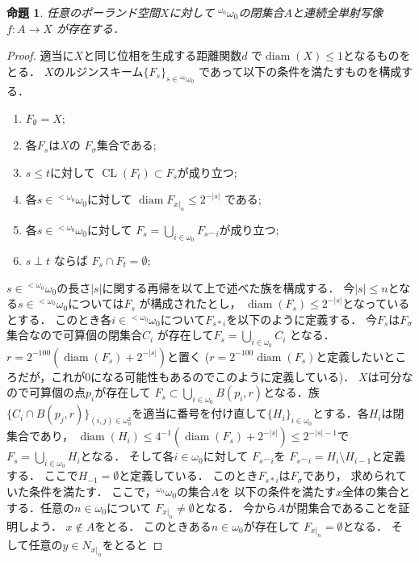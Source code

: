 \documentclass[leqno, 12pt]{jsarticle}
\newtheorem{prop}[thm]{命題}
\DeclareMathOperator{\cl}{CL}
\DeclareMathOperator{\di}{diam}
\newcommand{\myomega}{\omega_{0}}
\newcommand{\mybairetb}{{}^{<\myomega}\myomega}
\newcommand{\mybaire}{{}^{\myomega}\myomega}
\newcommand{\myff}{\frown}
\newcommand{\mynbd}[1]{N_{#1}}
\begin{document}
\begin{prop}\label{prop:inj}
任意のポーランド空間$X$に対して
$\mybaire$の閉集合$A$と連続全単射写像
$f\colon A\to X$
が存在する．
\end{prop}
\begin{proof}
適当に$X$と同じ位相を生成する距離関数$d$
で$\di (X)\le 1$となるものをとる．
$X$のルジンスキーム$\{F_{s}\}_{s\in \mybaire}$
であって以下の条件を満たすものを構成する．
\begin{enumerate}[label=\textup{(\arabic*)}]
\item\label{item:l:0}
$F_{\emptyset}=X$;
\item\label{item:l:1}
各$F_{s}$は$X$の
$F_{\sigma}$集合である;
\item\label{item:l:2}
$s\le t$に対して
$\cl(F_{t})\subset F_{s}$が成り立つ;
\item\label{item:l:3}
各$s\in \mybairetb$に対して
$\di F_{x|_{n}}\le 2^{-|s|}$
である;
\item\label{item:l:4}
各$s\in \mybairetb$に対して
$F_{s}=\bigcup_{i\in \myomega}F_{s\myff i}$が成り立つ;
\item\label{item:l:5}
$s\perp t$ ならば
$F_{s}\cap F_{t}=\emptyset$;
\end{enumerate}
$s\in \mybairetb$の長さ$|s|$に関する再帰を以て上で述べた族を構成する．
今$|s|\le n$となる$s\in \mybairetb$については$F_{s}$
が構成されたとし，
$\di(F_{s})\le 2^{-|s|}$となっているとする．
このとき各$i\in \mybairetb$について$F_{s*i}$を以下のように定義する．
今$F_{s}$は$F_{\sigma}$集合なので可算個の閉集合$C_{i}$
が存在して$F_{s}=\bigcup_{i\in \myomega}C_{i}$
となる．$r=2^{-100}(\di (F_{s})+2^{-|s|})$と置く
($r=2^{-100}\di (F_{s})$と定義したいところだが，これが$0$になる可能性もあるのでこのように定義している)．
$X$は可分なので可算個の点$p_{i}$が存在して
$F_{s}\subset \bigcup_{i\in \myomega}B(p_{i}, r)$となる．族$\{C_{i}\cap B(p_{j}, r)\}_{(i, j)\in \myomega^{2}}$を適当に番号を付け直して$\{H_{i}\}_{i\in \myomega}$とする．各$H_{i}$は閉集合であり，
$\di(H_{i})\le 4^{-1}(\di (F_{s})+2^{-|s|})\le 2^{-|s|-1}$で
$F_{s}=\bigcup_{i\in \myomega}H_{i}$となる．
そして各$i\in \myomega$に対して
$F_{s\myff i}$を
$F_{s\myff i}=H_{i}\setminus H_{i-1}$と定義する．
ここで$H_{-1}=\emptyset$と定義している．
このとき$F_{s*i}$は$F_{\sigma}$であり，
求められていた条件を満たす．
ここで，$\mybaire$の集合$A$を
以下の条件を満たす$x$全体の集合とする．任意の$n\in \myomega$について
$F_{x|_{n}}\neq \emptyset$となる．
今から$A$が閉集合であることを証明しよう．
$x\not\in A$をとる．
このときある$n\in \myomega$が存在して
$F_{x|_{n}}=\emptyset$となる．
そして任意の$y\in \mynbd{x|_{n}}$をとると

\end{proof}
\end{document}
